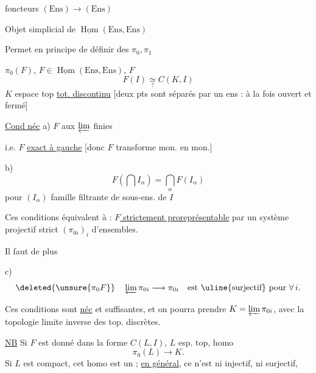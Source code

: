 foncteurs $(\mathrm{Ens})\to(\mathrm{Ens})$

Objet simplicial de $\underline{\operatorname{Hom}}(\mathrm{Ens},\mathrm{Ens})$

Permet en principe de définir des $\pi_0,\pi_1$

$\pi_0(F)$, $F\in\underline{\operatorname{Hom}}(\mathrm{Ens},\mathrm{Ens})$, $F$
\[
F(I)\underset{?}{\simeq}C(K,I)
\]
$K$ espace top \uline{tot. discontinu}
[deux pts sont séparés par un ens : à la fois ouvert et fermé]

\uline{Cond néc} a) $F$  aux
 $\varprojlim$ finies

i.e. $F$ \uline{exact à gauche}
[donc $F$ transforme mon. en mon.]

b) \[
F(\bigcap I_\alpha)=\bigcap_\alpha F(I_\alpha)
\]
pour $(I_\alpha)$ famille filtrante de sous-ens. de $I$

Ces conditions équivalent à : \uline{$F$ strictement proreprésentable}
par un système projectif strict $(\pi_{0i})_i$  d'ensembles.

Il faut de plus

c) \[
\deleted{\unsure{\pi_0F}}\quad
\varprojlim\pi_{0i}\longrightarrow\pi_{0i}
\quad\text{est \uline{surjectif} pour }\forall\,i.
\]

Ces conditions sont \uline{néc} et suffisantes, et on pourra prendre
$K=\varprojlim\pi_{0i}$, avec la topologie limite inverse des top. discrètes.

\uline{NB} Si $F$ est donné dans la forme $C(L,I)$, $L$ esp. top, homo
\[
\pi_0(L)\longrightarrow K.
\]
Si $L$ est  compact, cet homo est un
; \uline{en général}, ce n'est ni injectif, ni surjectif,

